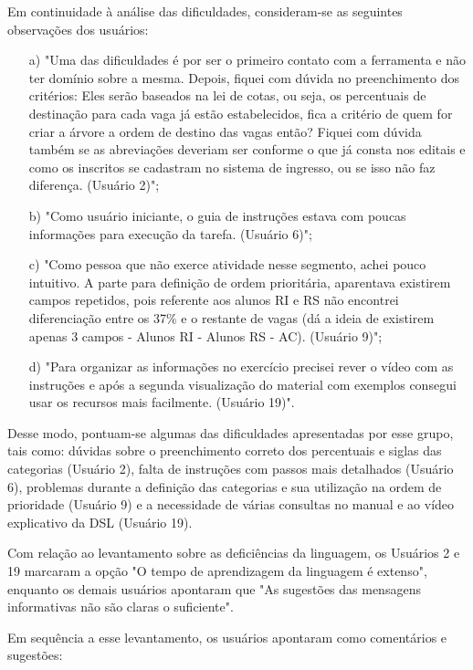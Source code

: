 Em continuidade à análise das dificuldades, consideram-se as seguintes observações dos usuários:

\begin{enumerate}
    \item [a)] "Uma das dificuldades é por ser o primeiro contato com a ferramenta e não ter domínio sobre a mesma. Depois, fiquei com dúvida no preenchimento dos critérios: Eles serão baseados na lei de cotas, ou seja, os percentuais de destinação para cada vaga já estão estabelecidos, fica a critério de quem for criar a árvore a ordem de destino das vagas então? Fiquei com dúvida também se as abreviações deveriam ser conforme o que já consta nos editais e como os inscritos se cadastram no sistema de ingresso, ou se isso não faz diferença. (Usuário 2)"; 
    \item [b)] "Como usuário iniciante, o guia de instruções estava com poucas informações para execução da tarefa. (Usuário 6)";     
    \item [c)] "Como pessoa que não exerce atividade nesse segmento, achei pouco intuitivo. A parte para definição de ordem prioritária, aparentava existirem campos repetidos, pois referente aos alunos RI e RS não encontrei diferenciação entre os 37\% e o restante de vagas (dá a ideia de existirem apenas 3 campos - Alunos RI - Alunos RS - AC). (Usuário 9)";
    \item [d)] "Para organizar as informações no exercício precisei rever o vídeo com as instruções e após a segunda visualização do material com exemplos consegui usar os recursos mais facilmente. (Usuário 19)".     
\end{enumerate}

Desse modo, pontuam-se algumas das dificuldades apresentadas por esse grupo, tais como: dúvidas sobre o preenchimento correto dos percentuais e siglas das categorias (Usuário 2), falta de instruções com passos mais detalhados (Usuário 6), problemas durante a definição das categorias e sua utilização na ordem de prioridade (Usuário 9) e a necessidade de várias consultas no manual e ao vídeo explicativo da DSL (Usuário 19). 

Com relação ao levantamento sobre as deficiências da linguagem, os Usuários 2 e 19 marcaram a opção "O tempo de aprendizagem da linguagem é extenso", enquanto os demais usuários apontaram que "As sugestões das mensagens informativas não são claras o suficiente". 

Em sequência a esse levantamento, os usuários apontaram como comentários e sugestões: 

